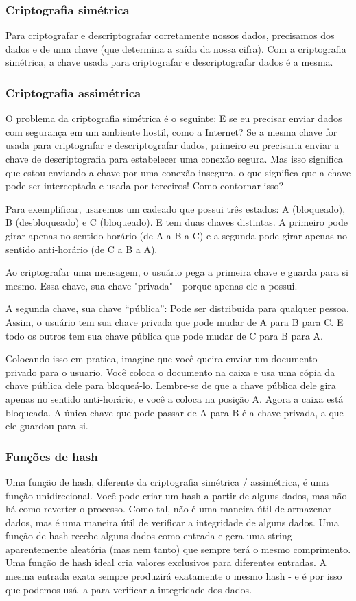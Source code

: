 \subsubsection{Criptografia simétrica}
Para criptografar e descriptografar corretamente nossos dados, precisamos dos dados e de uma chave (que determina a saída da nossa cifra).
Com a criptografia simétrica, a chave usada para criptografar e descriptografar dados é a mesma.

\subsubsection{Criptografia assimétrica}
O problema da criptografia simétrica é o seguinte: E se eu precisar enviar dados com segurança em um ambiente hostil, como a Internet? Se a mesma chave for usada para criptografar e descriptografar dados, primeiro eu precisaria enviar a chave de descriptografia para estabelecer uma conexão segura. Mas isso significa que estou enviando a chave por uma conexão insegura, o que significa que a chave pode ser interceptada e usada por terceiros! Como contornar isso? 

Para exemplificar, usaremos um cadeado que possui três estados: A (bloqueado), B (desbloqueado) e C (bloqueado).
E tem duas chaves distintas. A primeiro pode girar apenas no sentido horário (de A a B a C) e a segunda pode girar apenas no sentido anti-horário (de C a B a A).

Ao criptografar uma mensagem, o usuário pega a primeira chave e guarda para si mesmo. Essa chave, sua chave "privada" - porque apenas ele a possui.

A segunda chave, sua chave “pública”: Pode ser distribuida para qualquer pessoa. Assim, o usuário tem sua chave privada que pode mudar de A para B para C. E todo os outros tem sua chave pública que pode mudar de C para B para A.

Colocando isso em pratica, imagine que você queira enviar um documento privado para o usuario. Você coloca o documento na caixa e usa uma cópia da chave pública dele para bloqueá-lo. Lembre-se de que a chave pública dele gira apenas no sentido anti-horário, e você a coloca na posição A. Agora a caixa está bloqueada. A única chave que pode passar de A para B é a chave privada, a que ele guardou para si.

\subsubsection{Funções de hash}
Uma função de hash, diferente da criptografia simétrica / assimétrica, é uma função unidirecional. Você pode criar um hash a partir de alguns dados, mas não há como reverter o processo. Como tal, não é uma maneira útil de armazenar dados, mas é uma maneira útil de verificar a integridade de alguns dados.
Uma função de hash recebe alguns dados como entrada e gera uma string aparentemente aleatória (mas nem tanto) que sempre terá o mesmo comprimento. Uma função de hash ideal cria valores exclusivos para diferentes entradas. A mesma entrada exata sempre produzirá exatamente o mesmo hash - e é por isso que podemos usá-la para verificar a integridade dos dados.

